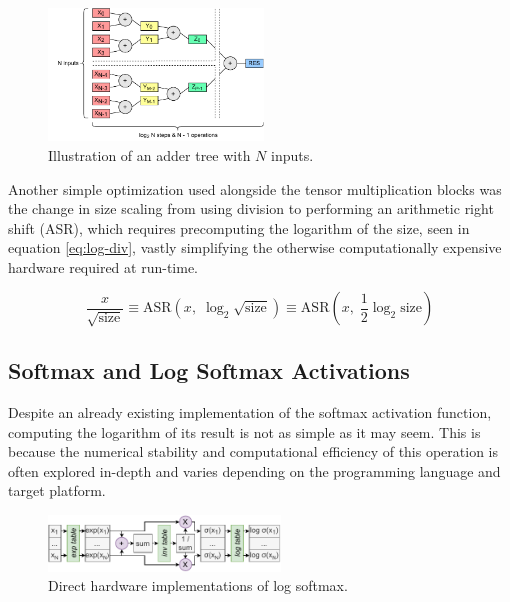 \begin{figure}[hpt!]
  \centering
  \includegraphics[trim={0cm 0cm 0cm 0cm}, width=0.51\textwidth, center]{quantization/adder_tree.pdf}
  \caption{Illustration of an adder tree with \(N\) inputs.}
  \label{fig:adder-tree}
\end{figure}

Another simple optimization used alongside the tensor multiplication blocks was the change in size scaling from using division to performing an arithmetic right shift (ASR), which requires precomputing the logarithm of the size, seen in equation \ref{eq:log-div}, vastly simplifying the otherwise computationally expensive hardware required at run-time.

\begin{equation}\label{eq:log-div}
  \frac{x}{\sqrt{\text{size}}} \equiv \text{ASR}(x,\; \log_2 \sqrt{\text{size}}) \equiv \text{ASR}(x,\; \frac{1}{2}\log_2 \text{size})
\end{equation}


\subsection{Softmax and Log Softmax Activations}
Despite an already existing \hlsml implementation of the softmax activation function, computing the logarithm of its result is not as simple as it may seem. This is because the numerical stability and computational efficiency of this operation is often explored in-depth \cite{60-blanchard2019accurate} and varies depending on the programming language and target platform.

\begin{figure}[hpt!]
  \centering
  \includegraphics[trim={0cm 0cm 0cm 0cm}, width=0.55\textwidth, center]{quantization/log_softmax_naive_h.pdf}
  \caption{Direct hardware implementations of log softmax.}
  \label{fig:log-softmax-naive}
\end{figure}

